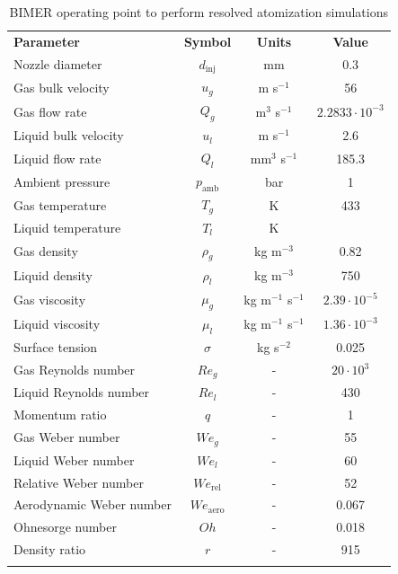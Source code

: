 \begin{table}[!h]
\centering
\caption{BIMER operating point to perform resolved atomization simulations}
\begin{tabular}{lccc}
\thickhline
\textbf{Parameter} & \textbf{Symbol} & \textbf{Units} &  \textbf{Value} \\
\thickhline
Nozzle diameter & $d_\mathrm{inj}$ & mm & 0.3 \\
Gas bulk velocity & $u_g$ & m s$^{-1}$ & 56 \\
Gas flow rate & $Q_g$ & m$^3$ s$^{-1}$ & $2.2833 \cdot 10^{-3}$   \\
Liquid bulk velocity & $u_l$ & m s$^{-1}$ & 2.6  \\
Liquid flow rate & $Q_l$ & mm$^3$ s$^{-1}$ & 185.3  \\
Ambient pressure & $p_\mathrm{amb}$ & bar &  1 \\
Gas temperature & $T_g$ & K & 433 \\
Liquid temperature & $T_l$ & K &  \\
Gas density & $\rho_g$ & kg m$^{-3}$ & 0.82 \\
Liquid density & $\rho_l$ & kg m$^{-3}$ & 750 \\
Gas viscosity & $\mu_g$ & kg m$^{-1}$ s$^{-1}$ & $2.39 \cdot 10^{-5}$ \\
Liquid viscosity & $\mu_l$ & kg m$^{-1}$ s$^{-1}$ &  $1.36 \cdot 10^{-3}$ \\
Surface tension & $\sigma$ & kg s$^{-2}$ &  0.025  \\
\thickhline
Gas Reynolds number & $Re_g$ & - & $20 \cdot 10^3$ \\ %
Liquid Reynolds number & $Re_l$ & - & 430 \\
Momentum ratio & $q$ & - & 1 \\ %
Gas Weber number & $We_g$ & - & 55 \\ %
Liquid Weber number & $We_l$ & - & 60 \\
Relative Weber number & $We_\mathrm{rel}$ & - & 52 \\ %
Aerodynamic Weber number & $We_\mathrm{aero}$ & - & 0.067 \\
Ohnesorge number & $Oh $ & - & 0.018 \\
Density ratio & $r$ & - & 915 \\
\thickhline
\end{tabular}
\label{tab:bimer_sps_operating_point}
\end{table}

